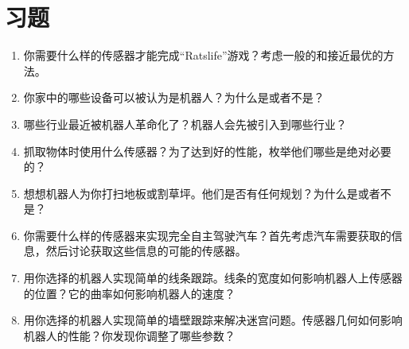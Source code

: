 
\section*{习题}\small
\begin{enumerate}
\item 你需要什么样的传感器才能完成“Ratslife”游戏？考虑一般的和接近最优的方法。
\item 你家中的哪些设备可以被认为是机器人？为什么是或者不是？
\item 哪些行业最近被机器人革命化了？机器人会先被引入到哪些行业？
\item 抓取物体时使用什么传感器？为了达到好的性能，枚举他们哪些是绝对必要的？
\item 想想机器人为你打扫地板或割草坪。他们是否有任何规划？为什么是或者不是？
\item 你需要什么样的传感器来实现完全自主驾驶汽车？首先考虑汽车需要获取的信息，然后讨论获取这些信息的可能的传感器。
\item 用你选择的机器人实现简单的线条跟踪。线条的宽度如何影响机器人上传感器的位置？它的曲率如何影响机器人的速度？
\item 用你选择的机器人实现简单的墙壁跟踪来解决迷宫问题。传感器几何如何影响机器人的性能？你发现你调整了哪些参数？
\end{enumerate}\normalsize


